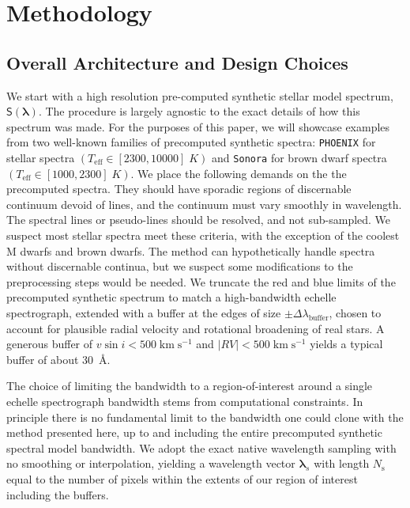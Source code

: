 \documentclass[modern]{aastex631}
\def\kmps{\mathrm{km}\;\mathrm{s}^{-1}}
\begin{document}
\section{Methodology}

\subsection{Overall Architecture and Design Choices}

We start with a high resolution pre-computed synthetic stellar model spectrum, $\mathsf{S}(\bm{\lambda})$.  The procedure is largely agnostic to the exact details of how this spectrum was made.  For the purposes of this paper, we will showcase examples from two well-known families of precomputed synthetic spectra: \texttt{PHOENIX} \citep{husser13} for stellar spectra $(T_{\mathrm{eff}}\in [2300, 10000]\;K)$ and \texttt{Sonora} \citep{2021ApJ...920...85M} for brown dwarf spectra $(T_{\mathrm{eff}}\in [1000, 2300]\;K)$.  We place the following demands on the the precomputed spectra.  They should have sporadic regions of discernable continuum devoid of lines, and the continuum must vary smoothly in wavelength.  The spectral lines or pseudo-lines should be resolved, and not sub-sampled.  We suspect most stellar spectra meet these criteria, with the exception of the coolest M dwarfs and brown dwarfs.  The method can hypothetically handle spectra without discernable continua, but we suspect some modifications to the preprocessing steps would be needed.  We truncate the red and blue limits of the precomputed synthetic spectrum to match a high-bandwidth echelle spectrograph, extended with a buffer at the edges of size $\pm \Delta \lambda_{\mathrm{buffer}}$, chosen to account for plausible radial velocity and rotational broadening of real stars.  A generous buffer of $v \sin{i} < 500 \;\kmps$ and $|RV|<500 \;\kmps$ yields a typical buffer of about 30~\AA.

The choice of limiting the bandwidth to a region-of-interest around a single echelle spectrograph bandwidth stems from computational constraints.  In principle there is no fundamental limit to the bandwidth one could clone with the method presented here, up to and including the entire precomputed synthetic spectral model bandwidth.  We adopt the exact native wavelength sampling with no smoothing or interpolation, yielding a wavelength vector $\bm{\lambda}_s$ with length $N_\mathrm{s}$ equal to the number of pixels within the extents of our region of interest including the buffers.
\end{document}
